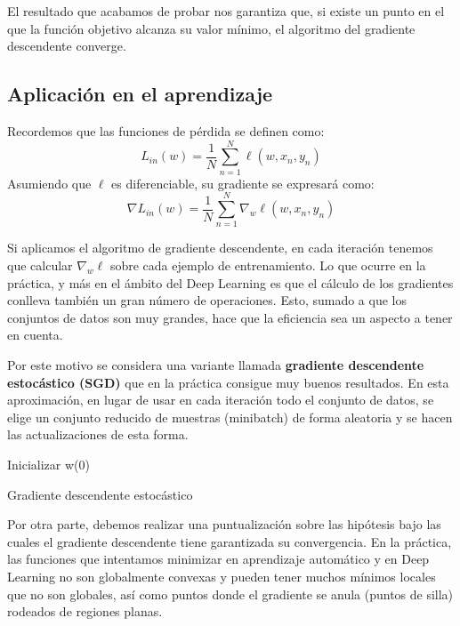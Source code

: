 El resultado que acabamos de probar nos garantiza que, si existe un punto en el que la función objetivo alcanza su valor mínimo, el algoritmo del gradiente descendente converge.

\subsection{Aplicación en el aprendizaje}
Recordemos que las funciones de pérdida se definen como:
$$ L_{in}(w) = \dfrac{1}{N} \sum_{n=1}^{N} \ell(w, x_n, y_n)$$ 
Asumiendo que $\ell$ es diferenciable, su gradiente se expresará como:
$$ \nabla L_{in}(w) = \dfrac{1}{N} \sum_{n=1}^{N} \nabla_w \ell(w, x_n, y_n) $$

Si aplicamos el algoritmo de gradiente descendente, en cada iteración tenemos que calcular $\nabla_w \ell$ sobre cada ejemplo de entrenamiento. Lo que ocurre en la práctica, y más en el ámbito del Deep Learning es que el cálculo de los gradientes conlleva también un gran número de operaciones. Esto, sumado a que los conjuntos de datos son muy grandes, hace que la eficiencia sea un aspecto a tener en cuenta.

Por este motivo se considera una variante llamada \textbf{gradiente descendente estocástico (SGD)} que en la práctica consigue muy buenos resultados. En esta aproximación, en lugar de usar en cada iteración todo el conjunto de datos, se elige un conjunto reducido de muestras (minibatch) de forma aleatoria y se hacen las actualizaciones de esta forma. 

\begin{algorithm}
	\SetAlgoLined
	Inicializar w(0)\\ 
	\caption{Gradiente descendente estocástico}
\end{algorithm}

Por otra parte, debemos realizar una puntualización sobre las hipótesis bajo las cuales el gradiente descendente tiene garantizada su convergencia. En la práctica, las funciones que intentamos minimizar en aprendizaje automático y en Deep Learning no son globalmente convexas y pueden tener muchos mínimos locales que no son globales, así como puntos donde el gradiente se anula (puntos de silla) rodeados de regiones planas.

